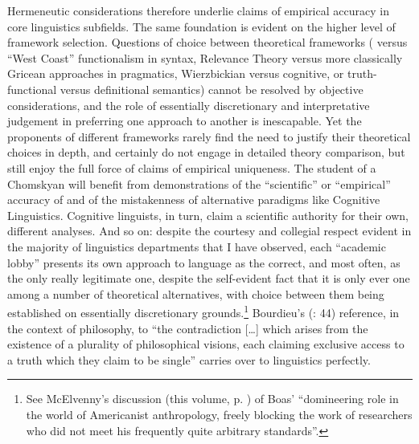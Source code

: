 \documentclass[output=paper]{langscibook}
\begin{document}
Hermeneutic considerations therefore underlie claims of empirical accuracy in core linguistics subfields. The same  foundation is evident on the higher level of framework selection. Questions of choice between theoretical frameworks ( versus ``West Coast'' functionalism in syntax, Relevance Theory versus more classically Gricean approaches in pragmatics, Wierz\-bic\-kian versus cognitive, or truth-functional versus definitional semantics) cannot be resolved by objective considerations, and the role of essentially discretionary and interpretative judgement in preferring one approach to another is inescapable. Yet the proponents of different frameworks rarely find the need to justify their theoretical choices in depth, and certainly do not engage in detailed theory comparison, but still enjoy the full force of claims of empirical uniqueness. The student of a Chomskyan will benefit from demonstrations of the ``scientific'' or ``empirical'' accuracy of  and of the mistakenness of alternative paradigms like Cognitive Linguistics. Cognitive linguists, in turn, claim a scientific authority for their own, different analyses. And so on: despite the courtesy and collegial respect evident in the majority of linguistics departments that I have observed, each ``academic lobby'' \citep[155]{Rastier1993} presents its own approach to language as the correct, and most often, as the only really legitimate one, despite the self-evident fact that it is only ever one among a number of theoretical alternatives, with choice between them being established on essentially discretionary grounds.\footnote{See McElvenny's discussion (this volume, p. \pageref{q:mcelvenny:domineering}) of Boas' ``domineering role in the world of Americanist anthropology, freely blocking the work of researchers who did not meet his frequently quite arbitrary standards''.} Bourdieu's (\citeyear{Bourdieu20031997}: 44) reference, in the context of philosophy, to ``the contradiction […] which arises from the existence of a plurality of philosophical visions, each claiming exclusive access to a truth which they claim to be single'' carries over to linguistics perfectly.
\end{document}
